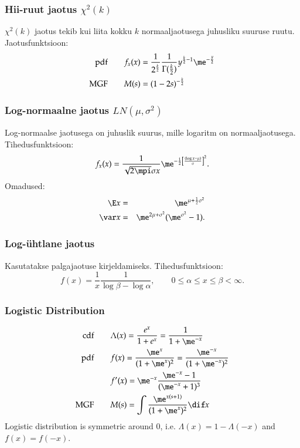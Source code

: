 \documentclass[a4paper]{article}
\numberwithin{equation}{subsection}
\begin{document}
\subsubsection{Hii-ruut jaotus $\chi^2(k)$}
$\chi^2 (k)$ jaotus tekib kui liita kokku $k$ normaaljaotusega
juhusliku suuruse ruutu.  Jaotusfunktsioon:
\begin{align}
\text{pdf}
\qquad &
f_x (x) = \frac{1}{2^\frac{k}{2}} \frac{1}{\Gamma(\frac{k}{2})}
  y^{\frac{k}{2} - 1} \me^{-\frac{y}{2}}
\\
\text{MGF}
\qquad &
M(s) = (1 - 2s)^{-\frac{k}{2}}
\end{align}


\subsubsection{Log-normaalne jaotus $LN(\mu,\sigma^2)$}
Log-normaalse jaotusega on juhuslik suurus, mille logaritm on
normaaljaotusega.  Tihedusfunktsioon:
\begin{equation}
f_x (x) = \frac{1}{\sqrt{2\mpi}\sigma x}
  \me^{-\frac{1}{2}\left[\frac{(\log x - \mu)}{\sigma}\right]^2}.
\end{equation}
Omadused:
\begin{eqnarray}
\E x &=& \me^{\mu + \frac{1}{2}\sigma^2}\\
\var x &=& \me^{2\mu + \sigma^2} (\me^{\sigma^2} - 1).
\end{eqnarray}

\subsubsection{Log-ühtlane jaotus}
Kasutatakse palgajaotuse kirjeldamiseks.  Tihedusfunktsioon:
\begin{equation}
  f(x) = \frac{1}{x}\frac{1}{\log \beta - \log \alpha}, \qquad
  0 \le \alpha \le x \le \beta < \infty.
\end{equation}

\subsubsection{Logistic Distribution}
\begin{align}
  \text{cdf}\qquad & \Lambda(x) = \frac{e^x}{1+e^x} = \frac{1}{1 + \me^{-x}}
  \\
  \text{pdf}\qquad & f(x) = \frac{\me^x}{(1 + \me^x)^2} = \frac{\me^{-x}}
  {(1 + \me^{-x})^2}
  \\
  & f'(x) = \me^{-x} \frac{\me^{-x} - 1}{(\me^{-x} + 1)^3}
  \\
  \text{MGF}\qquad &
  M(s) = \int \frac{\me^{x(s+1)}}{(1 + \me^x)^2} \dif x
\end{align}
Logistic distribution is symmetric around 0, i.e. $\Lambda(x) = 1 -
\Lambda(-x)$ and $f(x) = f(-x)$.
\end{document}
